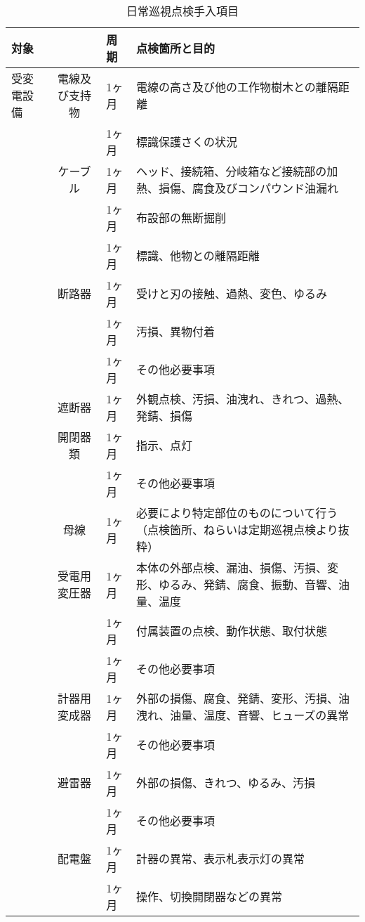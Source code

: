 \documentclass[10pt,a4paper,uplatex]{jsarticle}
\begin{document}
\begin{table}[!b]
\scriptsize
  \caption{日常巡視点検手入項目}
  \label{日常巡視点検手入項目}
  \begin{tabular}{|l|c|p{1cm}|p{10cm}|} \hline
    対象         & & 周期 & 点検箇所と目的  \\ \hline
受変電設備
    &電線及び支持物  & 1ヶ月 & 電線の高さ及び他の工作物樹木との離隔距離  \\
    &              & 1ヶ月 & 標識保護さくの状況  \\ \cline{2-4}
    &ケーブル       & 1ヶ月 & ヘッド、接続箱、分岐箱など接続部の加熱、損傷、腐食及びコンパウンド油漏れ  \\
    &              & 1ヶ月 & 布設部の無断掘削  \\ 
    &              & 1ヶ月 & 標識、他物との離隔距離  \\ \cline{2-4}
    &断路器         & 1ヶ月 & 受けと刃の接触、過熱、変色、ゆるみ  \\
    &              & 1ヶ月 & 汚損、異物付着  \\
    &              & 1ヶ月 & その他必要事項  \\\cline{2-4}
    &遮断器         & 1ヶ月 & 外観点検、汚損、油洩れ、きれつ、過熱、発錆、損傷  \\
    &開閉器類       & 1ヶ月 & 指示、点灯  \\ 
    &              & 1ヶ月 & その他必要事項  \\ \cline{2-4}
    &母線          & 1ヶ月 & 必要により特定部位のものについて行う（点検箇所、ねらいは定期巡視点検より抜粋）  \\ \cline{2-4}
    &受電用変圧器   & 1ヶ月 & 本体の外部点検、漏油、損傷、汚損、変形、ゆるみ、発錆、腐食、振動、音響、油量、温度  \\
    &              & 1ヶ月 & 付属装置の点検、動作状態、取付状態  \\ 
    &              & 1ヶ月 & その他必要事項  \\ \cline{2-4}
    &計器用変成器    & 1ヶ月 & 外部の損傷、腐食、発錆、変形、汚損、油洩れ、油量、温度、音響、ヒューズの異常  \\
    &              & 1ヶ月 & その他必要事項  \\ \cline{2-4}
    &避雷器         & 1ヶ月 & 外部の損傷、きれつ、ゆるみ、汚損  \\
    &              & 1ヶ月 & その他必要事項  \\ \cline{2-4}
    &配電盤         & 1ヶ月 & 計器の異常、表示札表示灯の異常  \\
    &              & 1ヶ月 & 操作、切換開閉器などの異常  \\

\end{tabular}
\end{table}
\end{document}
